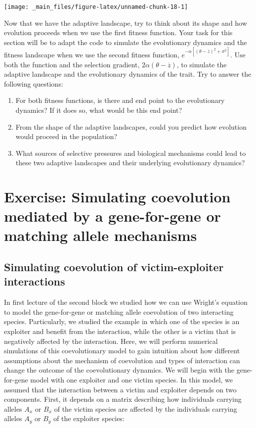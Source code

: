 \documentclass[
]{book}
\begin{document}
\texttt{[image: \_main\_files/figure-latex/unnamed-chunk-18-1]}

Now that we have the adaptive landscape, try to think about its shape and how evolution proceeds when we use the first fitness function. Your task for this section will be to adapt the code to simulate the evolutionary dynamics and the fitness landscape when we use the second fitness function, \(e^{-\alpha\left[\left(\theta-\overline{z}\right)^2 + \sigma^2\right]}\). Use both the function and the selection gradient, \(2\alpha (\theta-\overline{z})\), to simulate the adaptive landscape and the evolutionary dynamics of the trait. Try to answer the following questions:

\begin{enumerate}
\def\labelenumi{\arabic{enumi}.}
\item
  For both fitness functions, is there and end point to the evolutionary dynamics? If it does so, what would be this end point?
\item
  From the shape of the adaptive landscapes, could you predict how evolution would proceed in the population?
\item
  What sources of selective pressures and biological mechanisms could lead to these two adaptive landscapes and their underlying evolutionary dynamics?
\end{enumerate}

\hypertarget{exercise-simulating-coevolution-mediated-by-a-gene-for-gene-or-matching-allele-mechanisms}{%
\chapter{Exercise: Simulating coevolution mediated by a gene-for-gene or matching allele mechanisms}\label{exercise-simulating-coevolution-mediated-by-a-gene-for-gene-or-matching-allele-mechanisms}}

\hypertarget{simulating-coevolution-of-victim-exploiter-interactions}{%
\section{Simulating coevolution of victim-exploiter interactions}\label{simulating-coevolution-of-victim-exploiter-interactions}}

In first lecture of the second block we studied how we can use Wright's equation to model the gene-for-gene or matching allele coevolution of two interacting species. Particularly, we studied the example in which one of the species is an exploiter and benefit from the interaction, while the other is a victim that is negatively affected by the interaction. Here, we will perform numerical simulations of this coevolutionary model to gain intuition about how different assumptions about the mechanism of coevolution and types of interaction can change the outcome of the coevolutionary dynamics. We will begin with the gene-for-gene model with one exploiter and one victim species. In this model, we assumed that the interaction between a victim and exploiter depends on two components. First, it depends on a matrix describing how individuals carrying alleles \(A_{x}\) or \(B_{x}\) of the victim species are affected by the individuals carrying alleles \(A_{y}\) or \(B_{y}\) of the exploiter species:
\end{document}
